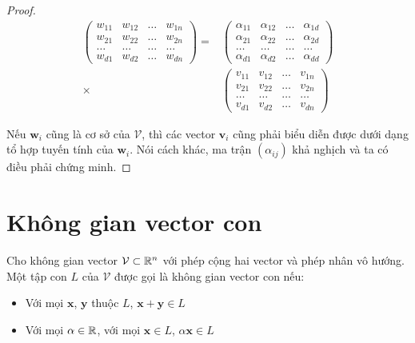 \begin{proof}
    \begin{align*}
        \begin{pmatrix}
            w_{11} & w_{12} & \ldots & w_{1n} \\
            w_{21} & w_{22} & \ldots & w_{2n} \\
            \ldots & \ldots & \ldots & \ldots \\
            w_{d1} & w_{d2} & \ldots & w_{dn}
        \end{pmatrix}
        = & \begin{pmatrix}
            \alpha_{11} & \alpha_{12} & \ldots & \alpha_{1d} \\
            \alpha_{21} & \alpha_{22} & \ldots & \alpha_{2d} \\
            \ldots & \ldots & \ldots & \ldots \\
            \alpha_{d1} & \alpha_{d2} & \ldots & \alpha_{dd}
        \end{pmatrix} \\
        \times & \begin{pmatrix}
            v_{11} & v_{12} & \ldots & v_{1n} \\ 
            v_{21} & v_{22} & \ldots & v_{2n} \\ 
            \ldots & \ldots & \ldots & \ldots \\ 
            v_{d1} & v_{d2} & \ldots & v_{dn}
        \end{pmatrix}
    \end{align*}
    
    Nếu $\bm{w}_i$ cũng là cơ sở của $\mathcal{V}$, thì các vector $\bm{v}_i$ cũng phải
    biểu diễn được dưới dạng tổ hợp tuyến tính của $\bm{w}_i$.
    Nói cách khác, ma trận $(\alpha_{ij})$ khả nghịch và ta có điều phải chứng minh.
\end{proof}



\section{Không gian vector con}

Cho không gian vector $\mathcal{V} \subset \mathbb{R}^n$ với phép cộng hai vector
và phép nhân vô hướng. Một tập con $L$ của $\mathcal{V}$ được gọi
là không gian vector con nếu:

\begin{itemize}
    \item Với mọi $\bm{x}$, $\bm{y}$ thuộc $L$, $\bm{x} + \bm{y} \in L$
    \item Với mọi $\alpha \in \mathbb{R}$, với mọi $\bm{x} \in L$, $\alpha \bm{x} \in L$
\end{itemize}

